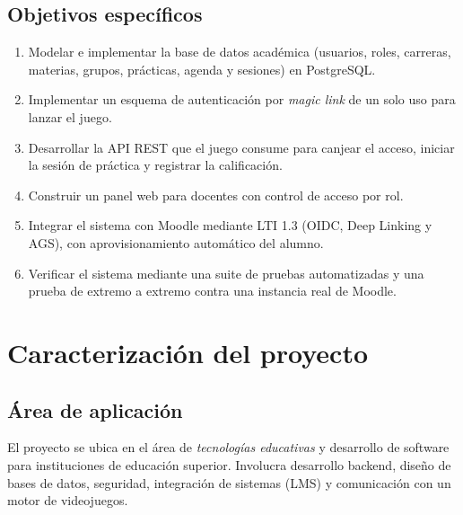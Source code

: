 \documentclass[12pt,letterpaper,oneside]{report}
\begin{document}
\section{Objetivos específicos}
\begin{enumerate}[leftmargin=1.6em]
  \item Modelar e implementar la base de datos académica (usuarios, roles,
  carreras, materias, grupos, prácticas, agenda y sesiones) en PostgreSQL.
  \item Implementar un esquema de autenticación por \emph{magic link} de un solo
  uso para lanzar el juego.
  \item Desarrollar la API REST que el juego consume para canjear el acceso,
  iniciar la sesión de práctica y registrar la calificación.
  \item Construir un panel web para docentes con control de acceso por rol.
  \item Integrar el sistema con Moodle mediante LTI 1.3 (OIDC, Deep Linking y
  AGS), con aprovisionamiento automático del alumno.
  \item Verificar el sistema mediante una suite de pruebas automatizadas y una
  prueba de extremo a extremo contra una instancia real de Moodle.
\end{enumerate}

\chapter{Caracterización del proyecto}

\section{Área de aplicación}
El proyecto se ubica en el área de \emph{tecnologías educativas} y desarrollo de
software para instituciones de educación superior. Involucra desarrollo backend,
diseño de bases de datos, seguridad, integración de sistemas (LMS) y
comunicación con un motor de videojuegos.
\end{document}
